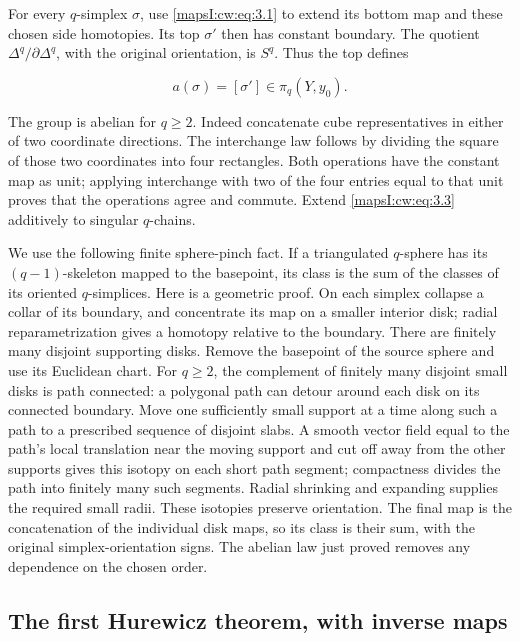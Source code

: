 \documentclass[11pt]{article}
\begin{document}
For every \(q\)-simplex \(\sigma\), use \eqref{mapsI:cw:eq:3.1} to extend its bottom map and these chosen side homotopies. Its top \(\sigma'\) then has constant boundary. The quotient \(\Delta^q/\partial\Delta^q\), with the original orientation, is \(S^q\). Thus the top defines

\begin{equation}
a(\sigma)=[\sigma']\in\pi_q(Y,y_0).
\label{mapsI:cw:eq:3.3}
\end{equation}

The group is abelian for \(q\geq2\). Indeed concatenate cube representatives in either of two coordinate directions. The interchange law follows by dividing the square of those two coordinates into four rectangles. Both operations have the constant map as unit; applying interchange with two of the four entries equal to that unit proves that the operations agree and commute. Extend \eqref{mapsI:cw:eq:3.3} additively to singular \(q\)-chains.

We use the following finite sphere-pinch fact. If a triangulated \(q\)-sphere has its \((q-1)\)-skeleton mapped to the basepoint, its class is the sum of the classes of its oriented \(q\)-simplices. Here is a geometric proof. On each simplex collapse a collar of its boundary, and concentrate its map on a smaller interior disk; radial reparametrization gives a homotopy relative to the boundary. There are finitely many disjoint supporting disks. Remove the basepoint of the source sphere and use its Euclidean chart. For \(q\geq2\), the complement of finitely many disjoint small disks is path connected: a polygonal path can detour around each disk on its connected boundary. Move one sufficiently small support at a time along such a path to a prescribed sequence of disjoint slabs. A smooth vector field equal to the path's local translation near the moving support and cut off away from the other supports gives this isotopy on each short path segment; compactness divides the path into finitely many such segments. Radial shrinking and expanding supplies the required small radii. These isotopies preserve orientation. The final map is the concatenation of the individual disk maps, so its class is their sum, with the original simplex-orientation signs. The abelian law just proved removes any dependence on the chosen order.

\subsection{The first Hurewicz theorem, with inverse maps}
\label{mapsI:cw:hurewicz-theorem}
\end{document}
